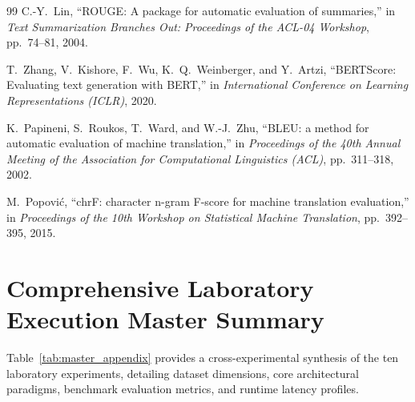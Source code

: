 \documentclass[12pt,a4paper]{report}
\begin{document}
\begin{thebibliography}{99}
C.-Y.~Lin,
``ROUGE: A package for automatic evaluation of summaries,''
in \emph{Text Summarization Branches Out: Proceedings of the ACL-04 Workshop}, pp.~74--81, 2004.

T.~Zhang, V.~Kishore, F.~Wu, K.~Q.~Weinberger, and Y.~Artzi,
``BERTScore: Evaluating text generation with BERT,''
in \emph{International Conference on Learning Representations (ICLR)}, 2020.

K.~Papineni, S.~Roukos, T.~Ward, and W.-J.~Zhu,
``BLEU: a method for automatic evaluation of machine translation,''
in \emph{Proceedings of the 40th Annual Meeting of the Association for Computational Linguistics (ACL)}, pp.~311--318, 2002.

M.~Popovi\'{c},
``chrF: character n-gram F-score for machine translation evaluation,''
in \emph{Proceedings of the 10th Workshop on Statistical Machine Translation}, pp.~392--395, 2015.

\end{thebibliography}

\appendix
\chapter{Comprehensive Laboratory Execution Master Summary}

Table~\ref{tab:master_appendix} provides a cross-experimental synthesis of the ten laboratory experiments, detailing dataset dimensions, core architectural paradigms, benchmark evaluation metrics, and runtime latency profiles.
\end{document}
